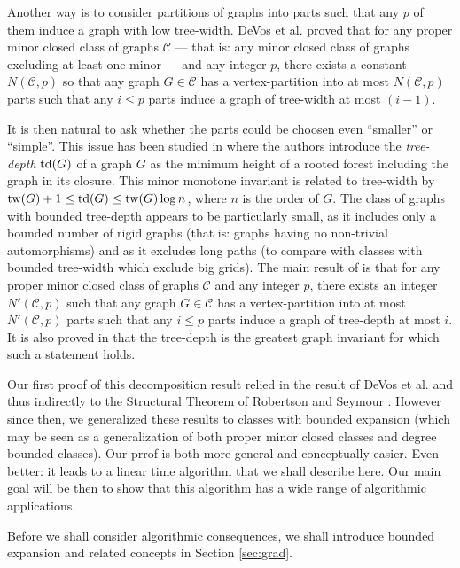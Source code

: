 \documentclass[a4paper]{amsart}
\theoremstyle{definition}
\theoremstyle{remark}
\DeclareMathOperator\depth{{\rm td}}
\DeclareMathOperator\tw{{\rm tw}}
\begin{document}
Another way is to consider partitions of graphs into parts such that
any $p$ of them induce a graph with low tree-width. DeVos et
al. \cite{2tw} proved that for any proper minor closed class of graphs
$\mathcal C$ ---
that is: any minor closed class of graphs excluding at least one minor
--- and any integer $p$, there exists a constant $N(\mathcal C,p)$
so that any graph $G\in\mathcal C$ has a vertex-partition into at most
$N(\mathcal
C,p)$ parts such that
any $i\leq p$ parts induce a graph of tree-width at most $(i-1)$.

It is then natural to ask whether the parts could be choosen 
even ``smaller'' or ``simple''.
This issue has been studied in \cite{Taxi_tdepth} where the authors
introduce the {\em tree-depth} $\depth(G)$ of a graph $G$ as the
minimum height of a 
rooted forest including the graph in its closure. This minor monotone
invariant is related to tree-width by
$\tw(G)+1\leq\depth(G)\leq\tw(G)\log n$, where $n$ is the order of
$G$. The class of graphs with bounded tree-depth appears to be
particularly small, as it includes only a bounded number of rigid
graphs (that is: graphs having no non-trivial automorphisms) and as it
excludes long paths (to compare with classes with bounded tree-width
which exclude big grids). The main result of \cite{Taxi_tdepth} is
that for any proper minor closed class of graphs $\mathcal C$ and any
integer $p$, there exists an integer $N'(\mathcal C,p)$ such that any
graph $G\in\mathcal C$ has a vertex-partition into at most
$N'(\mathcal C,p)$ parts such that any $i\leq p$ parts induce a graph
of tree-depth at most $i$. It is also proved in \cite{Taxi_tdepth} 
that the tree-depth is
the greatest graph invariant for which such a statement holds.

Our first proof \cite{Taxi_tdepth} of this decomposition result relied
in the result 
of DeVos et al. and thus indirectly to the Structural Theorem of
Robertson and Seymour \cite{GM16}.
However since then, we generalized these results \cite{ICGT05}\cite{POMNI}
 to classes
with bounded expansion (which may be seen as a generalization of both
proper minor closed classes and degree bounded classes). 
Our prrof is both more general and conceptually easier.
Even better: it leads to a linear time algorithm that we shall
describe here. Our main goal will be then to show that this algorithm
has a wide range of algorithmic applications.

Before we shall consider algorithmic consequences, 
we shall introduce bounded
expansion and related concepts in Section \ref{sec:grad}.
\end{document}

